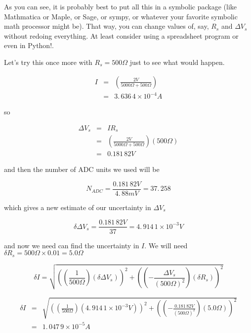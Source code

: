As you can see, it is probably best to put all this in a symbolic package (like Mathmatica or Maple, or Sage, or sympy, or whatever your favorite symbolic math processor might be). That way, you can change values of, say, $R_{s}$ and $\Delta V_{s}$ without redoing everything. At least consider using a spreadsheet program or even in Python!.

Let's try this once more with $R_{s}=500\unit{\Omega}$ just to see what would happen.

\begin{eqnarray*}
	I &=&\left( \frac{2\unit{V}}{5000\unit{\Omega}+500\unit{\Omega}}\right) \\
      &=&3.\,\allowbreak 636\,4\times 10^{-4}\unit{A}
\end{eqnarray*}

\noindent so

\begin{eqnarray*}
	\Delta V_{s} &=&IR_{s} \\
                 &=&\left( \frac{2\unit{V}}{5000\unit{\Omega}+500\unit{\Omega}}\right) \left( 500\unit{\Omega}\right) \\
                 &=&0.181\,82\unit{V}
\end{eqnarray*}

\noindent and then the number of ADC units we used will be 

\begin{equation*}
     N_{ADC}=\frac{0.181\,82\unit{V}}{4.\,\allowbreak 88\unit{mV}}=37.\,\allowbreak 258
\end{equation*}

\noindent which gives a new estimate of our uncertainty in $\Delta V_{s}$ 

\begin{equation*}
    \delta \Delta V_{s}=\frac{0.181\,82\unit{V}}{37}=4.\,\allowbreak914\,1\times 10^{-3}\unit{V}
\end{equation*}

\noindent and now we need can find the uncertainty in $I.$ We will need $\delta
R_{s}=500\unit{\Omega}\times 0.01=\allowbreak 5.0\unit{\Omega}$

\begin{equation*}
	\delta I=\sqrt{\left( \left( \frac{1}{500\unit{\Omega}}\right) \left( \delta \Delta V_{s}\right) \right) ^{2}+\left( \left( -\frac{\Delta V_{s}}{\left( 500\unit{\Omega}\right) ^{2}}\right) \left( \delta R_{s}\right) \right) ^{2}}
\end{equation*}

\begin{eqnarray*}
	\delta I &=&\sqrt{\left( \left( \frac{1}{500\unit{\Omega}}\right) \left( 4.\,\allowbreak 914\,1\times 10^{-3}\unit{V}\right) \right)^{2}+\left( \left( -\frac{0.181\,82\unit{V}}{\left( 500\unit{\Omega}\right) ^{2}}\right) \left( 5.0\unit{\Omega}\right) \right) ^{2}} \\
            &=&1.\,\allowbreak 047\,9\times 10^{-5}\unit{A}
\end{eqnarray*}


